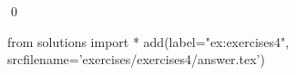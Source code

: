
\begin{ex} 
  \label{ex:exercises4}
  
  \qed
\end{ex} 
\begin{python0}
from solutions import *
add(label="ex:exercises4",
    srcfilename='exercises/exercises4/answer.tex') 
\end{python0}
